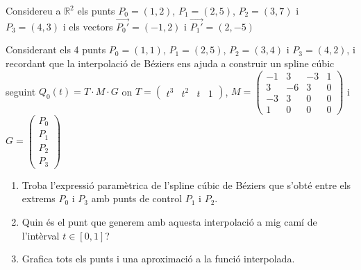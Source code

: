\Exercise
\label{Ex:interpolacio2}

Considereu a $\mathbb{R}^2$ els punts $P_0=(1,2)$, $P_1=(2,5)$, $P_2=(3,7)$ i $P_3=(4,3)$ i els vectors $\overrightarrow{P_0'}=(-1,2)$ i $\overrightarrow{P_1'}=(2,-5)$


Considerant els 4 punts $P_0=(1,1)$, $P_1=(2,5)$, $P_2=(3,4)$ i $P_3=(4,2)$, i recordant que la interpolació de Béziers ens ajuda a construir un spline cúbic seguint $Q_0(t)=T\cdot M \cdot G$ on
$  T= \begin{pmatrix}t^3 & t^2 & t & 1\end{pmatrix}$, $M= \begin{pmatrix}
              -1 & 3 & -3 & 1 \\
              3 & -6 & 3 & 0 \\
              -3 & 3 & 0 & 0 \\
              1 & 0 & 0 & 0
        \end{pmatrix}$ i $G= \begin{pmatrix}
              P_0 \\
              P_1 \\
              P_2 \\
              P_3
        \end{pmatrix}$
\begin{enumerate}
  \item Troba l'expressió paramètrica de l'spline cúbic de Béziers que s'obté entre els extrems $P_0$ i $P_3$ amb punts de control $P_1$ i $P_2$.
  \item Quin és el punt que generem amb aquesta interpolació a mig camí de l'intèrval $t\in[0,1]$?
  \item Grafica tots els punts i una aproximació a la funció interpolada.
\end{enumerate}

\Answer 

